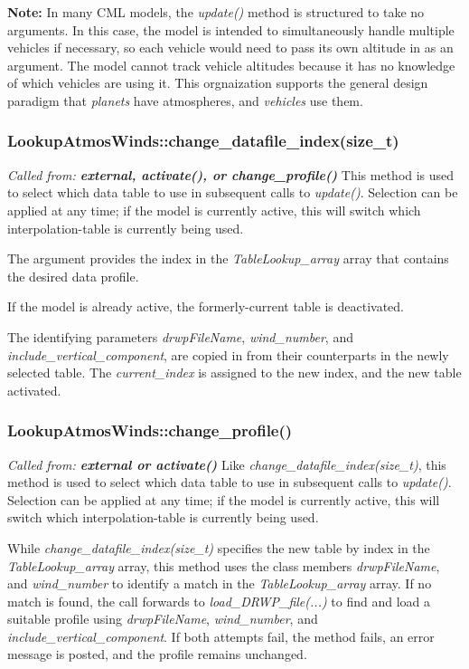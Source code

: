 \documentclass[11pt,fleqn]{report}
\begin{document}
\textbf{Note:} In many CML models, the \textit{update()} method is
structured to take no arguments. In this case, the model is intended to
simultaneously handle multiple vehicles if necessary, so each vehicle would
need to pass its own altitude in as an argument. The model cannot track
vehicle altitudes because it has no knowledge of which vehicles are using
it. This orgnaization supports the general design paradigm that
\textit{planets} have atmospheres, and \textit{vehicles} use them.


\subsubsection{LookupAtmosWinds::change\_datafile\_index(size\_t)}
\textit{Called from:  \textbf{external, activate(), or change\_profile()}}
This method is used to select which data table to use in subsequent calls
to \textit{update()}. Selection can be applied at any time; if the model is
currently active, this will switch which interpolation-table is currently
being used.

The argument provides the index in the \textit{TableLookup\_array} array that
contains the desired data profile.

If the model is already active, the formerly-current table is deactivated.

The identifying parameters \textit{drwpFileName},  \textit{wind\_number},
and \textit{include\_vertical\_component}, are copied in from their
counterparts in the newly selected table. The \textit{current\_index} is
assigned to the new index, and the new table activated.

\subsubsection{LookupAtmosWinds::change\_profile()}
\textit{Called from:  \textbf{external or activate()}}
Like \textit{change\_datafile\_index(size\_t)}, this method is used to
select which data table to use in subsequent calls
to \textit{update()}. Selection can be applied at any time; if the model is
currently active, this will switch which interpolation-table is currently
being used.

While \textit{change\_datafile\_index(size\_t)} specifies the new table by
index in the \textit{TableLookup\_array} array, this method uses the class
members \textit{drwpFileName}, and \textit{wind\_number} to identify a match
in the \textit{TableLookup\_array} array. If no match is found, the call
forwards to  \textit{load\_DRWP\_file(...)} to find and load a suitable
profile using \textit{drwpFileName}, \textit{wind\_number}, and
\textit{include\_vertical\_component}. If both attempts fail, the method
fails, an error message is posted, and the profile remains unchanged.
\end{document}
